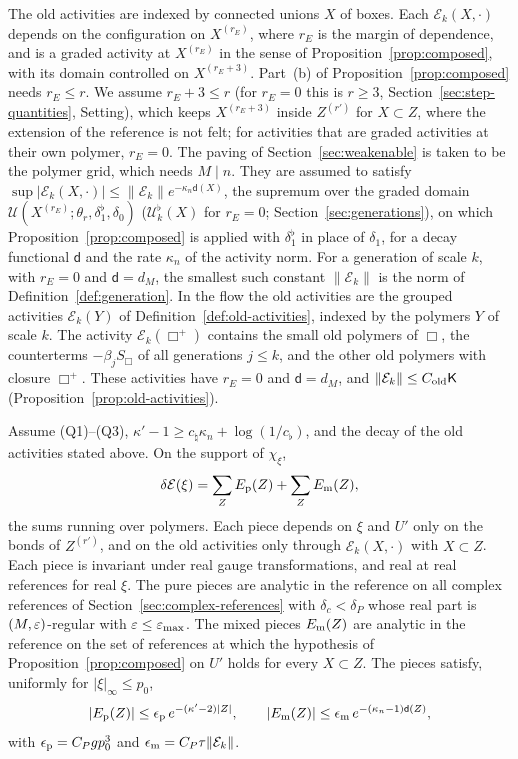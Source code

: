 The old activities are indexed by connected unions $X$ of boxes. Each $\mathcal E_k(X,\cdot)$ depends on the configuration on $X^{(r_E)}$, where $r_E$ is the margin of dependence, and is a graded activity at $X^{(r_E)}$ in the sense of Proposition~\ref{prop:composed}, with its domain controlled on $X^{(r_E+3)}$. Part~(b) of Proposition~\ref{prop:composed} needs $r_E\le r$. We assume $r_E+3\le r$ (for $r_E=0$ this is $r\ge3$, Section~\ref{sec:step-quantities}, Setting), which keeps $X^{(r_E+3)}$ inside $Z^{(r')}$ for $X\subset Z$, where the extension of the reference is not felt; for activities that are graded activities at their own polymer, $r_E=0$. The paving of Section~\ref{sec:weakenable} is taken to be the polymer grid, which needs $M\mid n$. They are assumed to satisfy $\sup|\mathcal E_k(X,\cdot)|\le\|\mathcal E_k\|e^{-\kappa_n\mathsf d(X)}$, the supremum over the graded domain $\mathcal U(X^{(r_E)};\theta_r,\delta_1^\flat,\delta_0)$ ($\mathcal U^\flat_k(X)$ for $r_E=0$; Section~\ref{sec:generations}), on which Proposition~\ref{prop:composed} is applied with $\delta_1^\flat$ in place of $\delta_1$, for a decay functional $\mathsf d$ and the rate $\kappa_n$ of the activity norm. For a generation of scale $k$, with $r_E=0$ and $\mathsf d=d_M$, the smallest such constant $\|\mathcal E_k\|$ is the norm of Definition~\ref{def:generation}. In the flow the old activities are the grouped activities $\mathcal E_k(Y)$ of Definition~\ref{def:old-activities}, indexed by the polymers $Y$ of scale $k$. The activity $\mathcal E_k(\Box^+)$ contains the small old polymers of $\Box$, the counterterms $-\beta_jS_\Box$ of all generations $j\le k$, and the other old polymers with closure $\Box^+$. These activities have $r_E=0$ and $\mathsf d=d_M$, and $\|\mathcal E_k\|\le C_{\rm old}\mathsf K$ (Proposition~\ref{prop:old-activities}).

\begin{proposition}\label{prop:localized-pieces}
Assume (Q1)--(Q3), $\kappa'-1\ge c_\natural\kappa_n+\log(1/c_\flat)$, and the decay of the old activities stated above. On the support of $\chi_\xi$,
\[
\delta\mathcal E(\xi)=\sum_ZE_{\rm p}(Z)+\sum_ZE_{\rm m}(Z),
\]
the sums running over polymers. Each piece depends on $\xi$ and $U'$ only on the bonds of $Z^{(r')}$, and on the old activities only through $\mathcal E_k(X,\cdot)$ with $X\subset Z$. Each piece is invariant under real gauge transformations, and real at real references for real $\xi$. The pure pieces are analytic in the reference on all complex references of Section~\ref{sec:complex-references} with $\delta_c<\delta_P$ whose real part is $(M,\varepsilon)$-regular with $\varepsilon\le\varepsilon_{\max}$. The mixed pieces $E_{\rm m}(Z)$ are analytic in the reference on the set of references at which the hypothesis of Proposition~\ref{prop:composed} on $U'$ holds for every $X\subset Z$. The pieces satisfy, uniformly for $|\xi|_\infty\le p_0$,
\[
|E_{\rm p}(Z)|\le\epsilon_{\rm p}\,e^{-(\kappa'-2)|Z|},\qquad|E_{\rm m}(Z)|\le\epsilon_{\rm m}\,e^{-(\kappa_n-1)\mathsf d(Z)},
\]
with $\epsilon_{\rm p}=C_Pgp_0^3$ and $\epsilon_{\rm m}=C_P\tau\|\mathcal E_k\|$.
\end{proposition}

